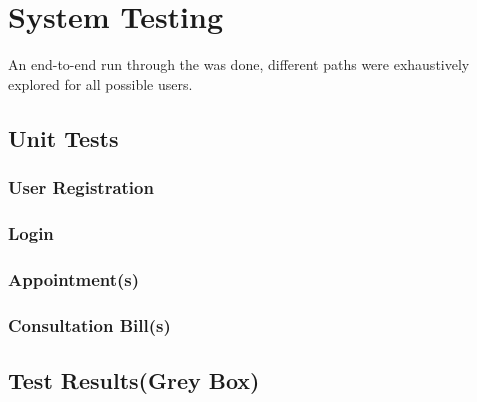 \documentclass[11 pt]{article}
\begin{document}
\section{System Testing}
An end-to-end run through the was done, different paths were exhaustively explored for all possible users. 
\subsection{Unit Tests}
\subsubsection*{User Registration}
\subsubsection*{Login}
\subsubsection*{Appointment(s)}
\subsubsection*{Consultation Bill(s)}
\subsection{Test Results(Grey Box)} 


 
\end{document}
